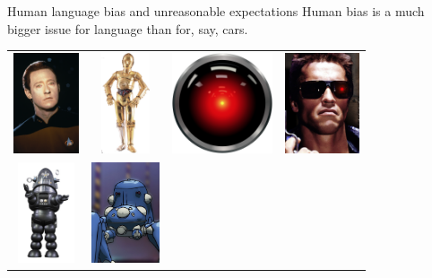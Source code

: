 \documentclass[xcolor={usenames,svgnames,x11names,dvipsnames,table}]{beamer}
\begin{document}
\begin{frame}{Human language bias and unreasonable expectations}
    Human bias is a much bigger issue for language than for, say, cars.
    \begin{center}
        \begin{tabular}{cccc}
            \includegraphics[height=8em]{./img/data} &
            \includegraphics[height=8em]{./img/c3po} &
            \includegraphics[height=8em]{./img/hal9000} &
            \includegraphics[height=8em]{./img/terminator} \\
            \includegraphics[height=8em]{./img/robby} &
            \includegraphics[height=8em]{./img/tachikoma} &

\end{tabular}
\end{center}
\end{frame}
\end{document}
